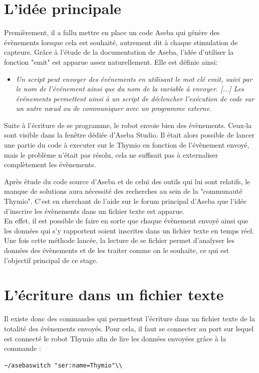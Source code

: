 \documentclass[a4paper, 12pt]{report}
\begin{document}
\section{L'idée principale}
Premièrement, il a fallu mettre en place un code Aseba qui génère des évènements lorsque cela est souhaité, autrement dit à chaque stimulation de capteurs. Grâce à l'étude de la documentation de Aseba, l'idée d'utiliser la fonction "emit" est apparue assez naturellement. Elle est définie ainsi:

\begin{itemize}
\item{\textit{Un script peut envoyer des événements en utilisant le mot clé emit, suivi par le nom de l'événement ainsi que du nom de la variable à envoyer. [...] Les événements permettent ainsi à un script de déclencher l'exécution de code sur un autre nœud ou de communiquer avec un programme externe.}}
\end{itemize}

Suite à l'écriture de se programme, le robot envoie bien des évènements. Ceux-la sont visible dans la fenêtre dédiée d'Aseba Studio. Il était alors possible de lancer une partie du code à executer sur le Thymio en fonction de l'évènement envoyé, mais le problème n'était pas résolu, cela ne suffisait pas à externaliser complètement les évènements.

Après étude du code source d'Aseba et de celui des outils qui lui sont relatifs, le manque de solutions aura nécessité des recherches au sein de la "communauté Thymio". C'est en cherchant de l'aide sur le forum principal d'Aseba que l'idée d'inscrire les évènements dans un fichier texte est apparue.\\
En effet, il est possible de faire en sorte que chaque évènement envoyé ainsi que les données qui s'y rapportent soient inscrites dans un fichier texte en temps réel. Une fois cette méthode lancée, la lecture de se fichier permet d'analyser les données des évènements et de les traiter comme on le souhaite, ce qui est l'objectif principal de ce stage.

\section{L'écriture dans un fichier texte}
Il existe donc des commandes qui permettent l'écriture dans un fichier texte de la totalité des évènements envoyés. Pour cela, il faut se connecter au port sur lequel est connecté le robot Thymio afin de lire les données envoyées grâce à la commande :
\begin{verbatim}
~/asebaswitch "ser:name=Thymio"\\
\end{verbatim}
 
\end{document}
